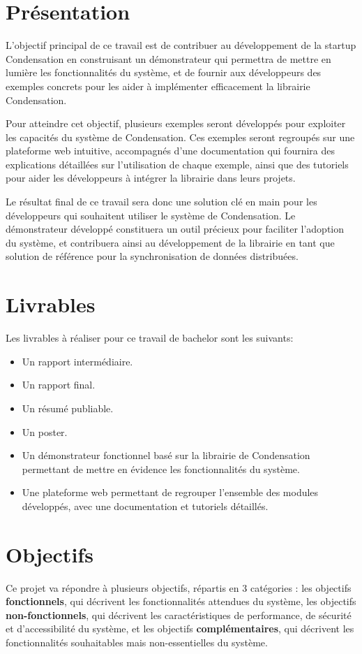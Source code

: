 \section*{Présentation}
L'objectif principal de ce travail est de contribuer au développement de la startup Condensation en construisant un démonstrateur qui permettra de mettre en lumière les fonctionnalités du système, et de fournir aux développeurs des exemples concrets pour les aider à implémenter efficacement la librairie Condensation.

Pour atteindre cet objectif, plusieurs exemples seront développés pour exploiter les capacités du système de Condensation. Ces exemples seront regroupés sur une plateforme web intuitive, accompagnés d'une documentation qui fournira des explications détaillées sur l'utilisation de chaque exemple, ainsi que des tutoriels pour aider les développeurs à intégrer la librairie dans leurs projets.

Le résultat final de ce travail sera donc une solution clé en main pour les développeurs qui souhaitent utiliser le système de Condensation. Le démonstrateur développé constituera un outil précieux pour faciliter l'adoption du système, et contribuera ainsi au développement de la librairie en tant que solution de référence pour la synchronisation de données distribuées.

\section*{Livrables}
Les livrables à réaliser pour ce travail de bachelor sont les suivants:

\begin{itemize}
    \item Un rapport intermédiaire.
    \item Un rapport final.
    \item Un résumé publiable.
    \item Un poster.
    \item Un démonstrateur fonctionnel basé sur la librairie de Condensation permettant de mettre en évidence les fonctionnalités du système.
    \item Une plateforme web permettant de regrouper l'ensemble des modules développés, avec une documentation et tutoriels détaillés.
\end{itemize}

\section*{Objectifs}
Ce projet va répondre à plusieurs objectifs, répartis en 3 catégories : les objectifs \textbf{fonctionnels}, qui décrivent les fonctionnalités attendues du système, les objectifs \textbf{non-fonctionnels}, qui décrivent les caractéristiques de performance, de sécurité et d'accessibilité du système, et les objectifs \textbf{complémentaires}, qui décrivent les fonctionnalités souhaitables mais non-essentielles du système.

